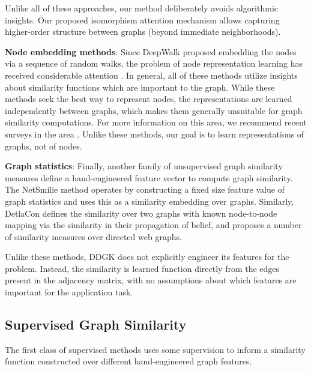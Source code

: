 \documentclass[sigconf]{acmart}
\newcommand{\ours}{\textsc{DDGK}}
\begin{document}
Unlike all of these approaches, our method deliberately avoids algorithmic insights.  
Our proposed isomorphism attention mechanism allows capturing higher-order structure between graphs (beyond immediate neighborhoods).


\noindent \textbf{Node embedding methods}: Since DeepWalk \cite{deepwalk} proposed embedding the nodes via a sequence of random walks, the problem of node representation learning has received considerable attention \cite{perozzi2017don,node2vec,chen2017harp,tsitsulin2017verse,bojchevski2017deep,abu2018watch,aepasto2019}.  In general, all of these methods utilize insights about similarity functions which are important to the graph.
While these methods seek the best way to represent nodes, the representations are learned independently between graphs, which makes them generally unsuitable for graph similarity computations.
For more information on this area, we recommend recent surveys in the area \cite{chen2018tutorial,cui2018survey}.
Unlike these methods, our goal is to learn representations of graphs, not of nodes.

\noindent \textbf{Graph statistics}:
Finally, another family of unsupervised graph similarity measures define a hand-engineered feature vector to compute graph similarity.  
The NetSmilie method \cite{berlingerio2012netsimile} operates by constructing a fixed size feature value of graph statistics and uses this as a similarity embedding over graphs.  
Similarly, DetlaCon \cite {koutra2013deltacon} defines the similarity over two graphs with known node-to-node mapping via the similarity in their propagation of belief, and \cite{papadimitriou2010web} proposes a number of similarity measures over directed web graphs.

Unlike these methods, \ours{} does not explicitly engineer its features for the problem.  Instead, the similarity is learned function directly from the edges present in the adjacency matrix, with no assumptions about which features are important for the application task.



\subsection{Supervised Graph Similarity}
The first class of supervised methods uses some supervision to inform a similarity function constructed over different hand-engineered graph features.
\end{document}
